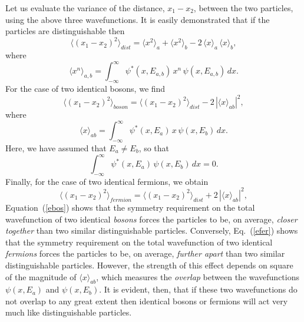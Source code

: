 Let us evaluate the variance of the distance, $x_1-x_2$, between the
two particles, using the above three wavefunctions. It is easily
demonstrated that if the particles are distinguishable then
\begin{equation}
\langle (x_1-x_2)^2\rangle_{dist} = \langle x^2\rangle_a + \langle x^2\rangle_b - 2\,\langle x\rangle_a\,\langle x\rangle_b,
\end{equation}
where
\begin{equation}
\langle x^n\rangle_{a,b} = \int_{-\infty}^\infty\psi^\ast(x,E_{a,b})\,x^n\,\psi(x,E_{a,b})\,dx.
\end{equation}
For the case of two identical bosons, we find
\begin{equation}\label{ebos}
\langle (x_1-x_2)^2\rangle_{boson} = \langle (x_1-x_2)^2\rangle_{dist} -
2\,|\langle x\rangle_{ab}|^2,
\end{equation}
where
\begin{equation}
\langle x \rangle_{ab} = \int_{-\infty}^\infty \psi^\ast(x,E_a)\,x\,\psi(x,E_b)\,dx.
\end{equation}
Here, we have assumed that $E_a\neq E_b$, so that
\begin{equation}
\int_{-\infty}^\infty \psi^\ast(x,E_a)\,\psi(x,E_b)\,dx = 0.
\end{equation}
Finally, for the case of two identical fermions,  we obtain
\begin{equation}\label{efer}
\langle (x_1-x_2)^2\rangle_{fermion} = \langle (x_1-x_2)^2\rangle_{dist} +
2\,|\langle x\rangle_{ab}|^2,
\end{equation}
Equation~(\ref{ebos})  shows that
the symmetry requirement on the total wavefunction of two identical {\em bosons}\/ forces the
particles to be, on average, {\em closer together}\/ than two similar distinguishable
particles. Conversely, Eq.~(\ref{efer}) shows that the symmetry requirement on the total wavefunction of two identical {\em fermions}\/ forces the
particles to be, on average, {\em further apart}\/ than two similar distinguishable
particles. However, the strength of this effect depends on square of the magnitude of $\langle x\rangle_{ab}$, which measures the {\em overlap}\/ between the
wavefunctions $\psi(x,E_a)$ and $\psi(x,E_b)$. It is evident, then, that
if these two wavefunctions do not overlap to any great extent then identical
bosons or fermions will act very much like distinguishable particles. 

